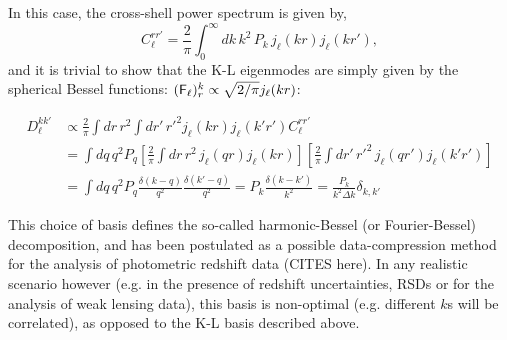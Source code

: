 \documentclass[twocolumn,amsfont,amssymb,amsmath, showpacs,balancelastpage, nofootinbib]{revtex4-1}
\begin{document}
    In this case, the cross-shell power spectrum is given by,
    \begin{equation}
      C_\ell^{rr'}=\frac{2}{\pi}\int_0^\infty dk\,k^2\,P_k\,j_\ell(kr)j_\ell(kr'),
    \end{equation}
    and it is trivial to show that the K-L eigenmodes are simply given by the spherical Bessel functions: $({\sf F}_\ell)^k_r\propto \sqrt{2/\pi}j_\ell(kr)$:
    \begin{widetext}
    \begin{align}
      D_\ell^{kk'}&\propto\frac{2}{\pi}\int dr\,r^2\int dr'\,r'^2 j_\ell(kr)j_\ell(k'r') C_\ell^{rr'}\\
      &=\int dq\,q^2P_q\left[\frac{2}{\pi}\int dr\,r^2\,j_\ell(qr)j_\ell(kr)\right]\left[\frac{2}{\pi}\int dr'\,r'^2\,j_\ell(qr')j_\ell(k'r')\right]\\
      &=\int dq\,q^2P_q\frac{\delta(k-q)}{q^2}\frac{\delta(k'-q)}{q^2}=P_k\frac{\delta(k-k')}{k^2}=\frac{P_k}{k^2\Delta k}\delta_{k,k'}
    \end{align}
    \end{widetext}
   
    This choice of basis defines the so-called harmonic-Bessel (or Fourier-Bessel) decomposition, and has been postulated as a possible data-compression method for the analysis of photometric redshift data (CITES here). In any realistic scenario however (e.g. in the presence of redshift uncertainties, RSDs or for the analysis of weak lensing data), this basis is non-optimal (e.g. different $k$s will be correlated), as opposed to the K-L basis described above.
\end{document}
